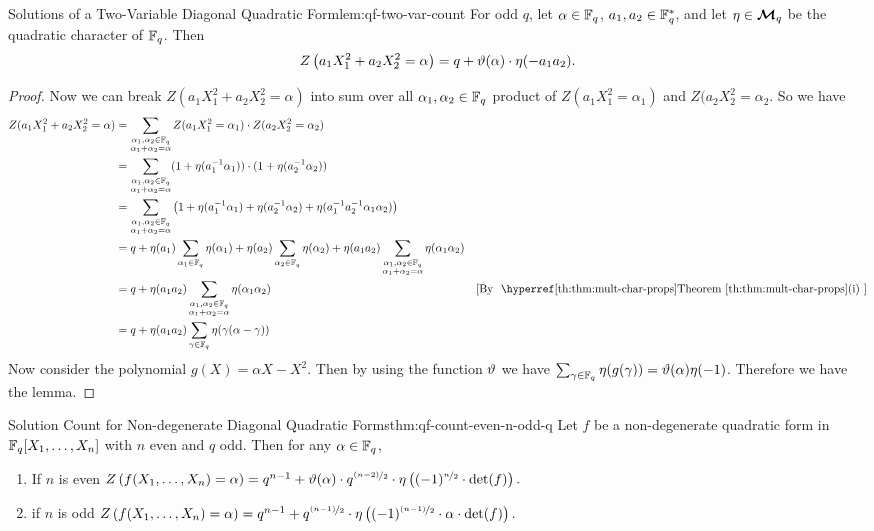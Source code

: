 \begin{lemma}{Solutions of a Two-Variable Diagonal Quadratic Form}{lem:qf-two-var-count}
  For odd $q$, let $\alpha\in\mathbb{F}_q$, $a_1,a_2\in\mathbb{F}_q^*$, and let $\eta\in\boldsymbol{\mathcal{M}}_q$ be the quadratic character of $\mathbb{F}_q$. Then $$Z\left(a_1X_1^2+a_2X_2^2=\alpha\right)=q+\vartheta(\alpha)\cdot \eta(-a_1a_2).$$
\end{lemma}
\begin{proof}
  Now we can break $Z(a_1X_1^2+a_2X_2^2=\alpha)$ into sum over all $\alpha_1,\alpha_2\in\mathbb{F}_q$ product of $Z(a_1X_1^2=\alpha_1)$ and $Z(a_2X_2^2=\alpha_2$. So we have 
  \begin{align*}
    Z(a_1X_1^2+a_2X_2^2=\alpha) & = \sum_{\substack{\alpha_1,\alpha_2\in\bbF_q\\ \alpha_1+\alpha_2=\alpha}}Z(a_1X_1^2=\alpha_1)\cdot Z(a_2X_2^2=\alpha_2)\\ 
    & = \sum_{\substack{\alpha_1,\alpha_2\in\bbF_q\\ \alpha_1+\alpha_2=\alpha}} (1+\eta(a_1^{-1}\alpha_1))\cdot (1+\eta(a_2^{-1}\alpha_2))\\ 
    & = \sum_{\substack{\alpha_1,\alpha_2\in\bbF_q\\ \alpha_1+\alpha_2=\alpha}} \lt(1+\eta(a_1^{-1}\alpha_1)+\eta(a_2^{-1}\alpha_2)+\eta(a_1^{-1}a_2^{-1}\alpha_1\alpha_2)\rt)\\ 
    & = q+ \eta(a_1)\sum_{\alpha_1\in\bbF_q}\eta(\alpha_1)+\eta(a_2)\sum_{\alpha_2\in\bbF_q}\eta(\alpha_2)+\eta(a_1a_2)\sum_{\substack{\alpha_1,\alpha_2\in\bbF_q\\ \alpha_1+\alpha_2=\alpha}}\eta(\alpha_1\alpha_2)\\ 
    & = q+\eta(a_1a_2)\sum_{\substack{\alpha_1,\alpha_2\in\bbF_q\\ \alpha_1+\alpha_2=\alpha}}\eta(\alpha_1\alpha_2) \by{\MultCharPropsthm[(i)]}\\ 
    & = q+\eta(a_1a_2)\sum_{\gm\in\bbF_q}\eta(\gm(\alpha-\gm))
  \end{align*}
  Now consider the polynomial $g(X)=\alpha X-X^2$. Then by \EtaQuadPolythm using the function $\vartheta$ we have $\sum_{\gamma\in\mathbb{F}_q}\eta(g(\gamma))=\vartheta(\alpha)\eta(-1)$. Therefore we have the lemma. 
\end{proof}
\begin{Theorem}{Solution Count for Non-degenerate Diagonal Quadratic Forms}{thm:qf-count-even-n-odd-q}
  Let $f$ be a non-degenerate quadratic form in $\mathbb{F}_q[X_1,\dots,X_n]$ with $n$ even and $q$ odd. Then for any $\alpha\in\mathbb{F}_q$,
  \begin{enumerate}[label=(\roman*)]
    \item If $n$ is even $Z\left(f(X_1,\dots,X_n)=\alpha\right)=q^{n-1}+\vartheta(\alpha)\cdot q^{\nicefrac{(n-2)}{2}}\cdot \eta\left((-1)^{\nicefrac{n}{2}}\cdot \det(f)\right).$
    \item if $n$ is odd $Z\left(f(X_1,\dots, X_n)=\alpha\right)=q^{n-1}+q^{\nicefrac{(n-1)}{2}}\cdot \eta\left((-1)^{\nicefrac{(n-1)}{2}}\cdot \alpha\cdot \det(f)\right).$
  \end{enumerate}
\end{Theorem}
